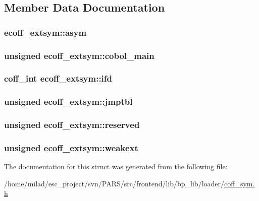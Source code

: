 \subsection{Member Data Documentation}
\hypertarget{structecoff__extsym_a87f587c09c222ba0922c7ee88c1a6b8b}{
\subsubsection[{asym}]{ {\bf ecoff\_\-extsym::asym}}}
\label{structecoff__extsym_a87f587c09c222ba0922c7ee88c1a6b8b}
\hypertarget{structecoff__extsym_acbb40b2a7a64c4d3b141277f8cd7f735}{
\subsubsection[{cobol\_\-main}]{\setlength{\rightskip}{0pt plus 5cm}unsigned {\bf ecoff\_\-extsym::cobol\_\-main}}}
\label{structecoff__extsym_acbb40b2a7a64c4d3b141277f8cd7f735}
\hypertarget{structecoff__extsym_add003edd8dbbaa77df9d6632e7cbefab}{
\subsubsection[{ifd}]{\setlength{\rightskip}{0pt plus 5cm}coff\_\-int {\bf ecoff\_\-extsym::ifd}}}
\label{structecoff__extsym_add003edd8dbbaa77df9d6632e7cbefab}
\hypertarget{structecoff__extsym_a803653253624913be2a4593db1429fb1}{
\subsubsection[{jmptbl}]{\setlength{\rightskip}{0pt plus 5cm}unsigned {\bf ecoff\_\-extsym::jmptbl}}}
\label{structecoff__extsym_a803653253624913be2a4593db1429fb1}
\hypertarget{structecoff__extsym_a190ce15962a8ce49490bbddc1574d11e}{
\subsubsection[{reserved}]{\setlength{\rightskip}{0pt plus 5cm}unsigned {\bf ecoff\_\-extsym::reserved}}}
\label{structecoff__extsym_a190ce15962a8ce49490bbddc1574d11e}
\hypertarget{structecoff__extsym_afc5d5b07df88423a1f2c1d11ad5b4caa}{
\subsubsection[{weakext}]{\setlength{\rightskip}{0pt plus 5cm}unsigned {\bf ecoff\_\-extsym::weakext}}}
\label{structecoff__extsym_afc5d5b07df88423a1f2c1d11ad5b4caa}


The documentation for this struct was generated from the following file:\begin{DoxyCompactItemize}
\item 
/home/milad/esc\_\-project/svn/PARS/src/frontend/lib/bp\_\-lib/loader/\hyperlink{coff__sym_8h}{coff\_\-sym.h}\end{DoxyCompactItemize}
